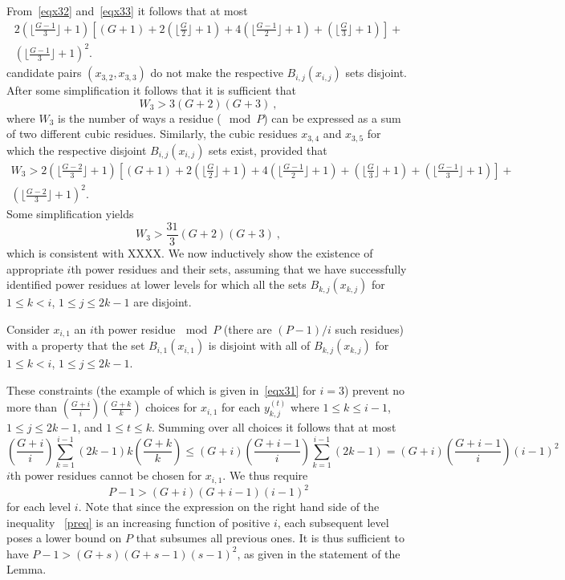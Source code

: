 From~\eqref{eqx32} and~\eqref{eqx33} it follows that at most
\begin{equation*}\begin{array}{lll} 2 \left( \lfloor \frac{G-1}{3}\rfloor +1\right) \left[
(G+1)+2\left( \lfloor \frac{G}{2}\rfloor +1\right) +4\left(
\lfloor \frac{G-1}{2}\rfloor +1\right) + \left( \lfloor
\frac{G}{3}\rfloor +1\right)\right]+ \\\left( \lfloor
\frac{G-1}{3}\rfloor +1\right)^2.
\end{array}\end{equation*}
candidate pairs $(x_{3,2},x_{3,3})$ do not make the respective
$B_{i,j}(x_{i,j})$ sets disjoint. After some simplification it
follows that it is sufficient that
\[
W_3 > 3 (G+2)(G+3)~,
\]
where $W_3$ is the number of ways a residue ($\mod P$) can be
expressed as a sum of two different cubic residues. Similarly, the
cubic residues $x_{3,4}$ and $x_{3,5}$ for which the respective
disjoint $B_{i,j}(x_{i,j})$ sets  exist, provided that
\begin{equation*}\begin{array}{lll} W_3
> 2 \left( \lfloor \frac{G-2}{3}\rfloor +1\right)\left[
(G+1)+2\left( \lfloor \frac{G}{2}\rfloor +1\right) +4\left(
\lfloor \frac{G-1}{2}\rfloor +1\right)  +\left( \lfloor
\frac{G}{3}\rfloor
+1\right)+\left( \lfloor \frac{G-1}{3}\rfloor +1\right)\right]+\\
\left( \lfloor \frac{G-2}{3}\rfloor +1\right)^2.
\end{array}\end{equation*}
Some simplification yields
\[
W_3 > \frac{31}{3} (G+2)(G+3)~,
\]
which is consistent with XXXX.
  We now inductively show the existence of appropriate
$i$th power residues and their sets, assuming that we have
successfully identified power residues at lower levels for which
all the sets $B_{k,j}(x_{k,j})$ for $1 \leq k <i$, $1 \leq j \leq
2k-1$ are disjoint.

Consider $x_{i,1}$ an $i$th power residue$~\mod P$ (there are
$(P-1)/i$ such  residues) with a property that the set
$B_{i,1}(x_{i,1})$ is disjoint with all of $B_{k,j}(x_{k,j})$ for
$1 \leq k <i$, $1 \leq j \leq 2k-1$.

These  constraints (the example of which is given in~\eqref{eqx31}
for $i=3$) prevent no more than $(\frac{G+i}{i})(\frac{G+k}{k})$
choices for $x_{i,1}$ for each $y_{k,j}^{(t)}$ where $1 \leq k
\leq i-1$, $1 \leq j \leq 2k-1$, and $1 \leq t \leq k$. Summing
over all choices it follows that at most
\begin{equation} (\frac{G+i}{i}) \sum_{k=1}^{i-1}
(2k-1)k(\frac{G+k}{k})\leq (G+i)(\frac{G+i-1}{i}) \sum_{k=1}^{i-1}
(2k-1)=(G+i)(\frac{G+i-1}{i})(i-1)^2
\end{equation}
$i$th power residues cannot be chosen for  $x_{i,1}$. We thus
require
\begin{equation}\label{preq}
P-1 > (G+i)(G+i-1)(i-1)^2
\end{equation}
for each level $i$. Note that since the expression on the right
hand side of the inequality ~\eqref{preq} is an increasing
function of positive $i$, each subsequent level poses a lower
bound on $P$ that subsumes all previous ones. It is thus
sufficient to have $P-1 > (G+s)(G+s-1)(s-1)^2$, as given in the
statement of the Lemma.

